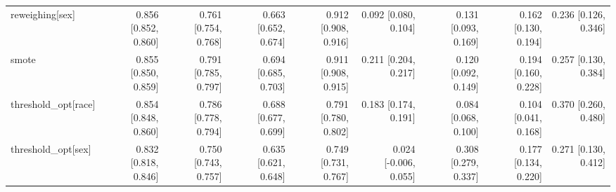 \begin{table}[t]
{\begin{tabular}{lrrrrrrrr}
reweighing[sex] & 0.856 [0.852, 0.860] & 0.761 [0.754, 0.768] & 0.663 [0.652, 0.674] & 0.912 [0.908, 0.916] & 0.092 [0.080, 0.104] & 0.131 [0.093, 0.169] & 0.162 [0.130, 0.194] & 0.236 [0.126, 0.346] \\
smote & 0.855 [0.850, 0.859] & 0.791 [0.785, 0.797] & 0.694 [0.685, 0.703] & 0.911 [0.908, 0.915] & 0.211 [0.204, 0.217] & 0.120 [0.092, 0.149] & 0.194 [0.160, 0.228] & 0.257 [0.130, 0.384] \\
threshold\_opt[race] & 0.854 [0.848, 0.860] & 0.786 [0.778, 0.794] & 0.688 [0.677, 0.699] & 0.791 [0.780, 0.802] & 0.183 [0.174, 0.191] & 0.084 [0.068, 0.100] & 0.104 [0.041, 0.168] & 0.370 [0.260, 0.480] \\
threshold\_opt[sex] & 0.832 [0.818, 0.846] & 0.750 [0.743, 0.757] & 0.635 [0.621, 0.648] & 0.749 [0.731, 0.767] & 0.024 [-0.006, 0.055] & 0.308 [0.279, 0.337] & 0.177 [0.134, 0.220] & 0.271 [0.130, 0.412] \\
\bottomrule
\end{tabular}}
\end{table}
